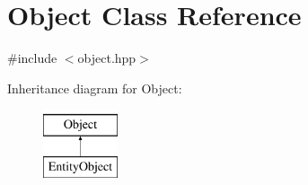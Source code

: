 \hypertarget{class_object}{}\section{Object Class Reference}
\label{class_object}


{\ttfamily \#include $<$object.\+hpp$>$}

Inheritance diagram for Object\+:\begin{figure}[H]
\begin{center}
\leavevmode
\includegraphics[height=2.000000cm]{class_object}
\end{center}
\end{figure}
